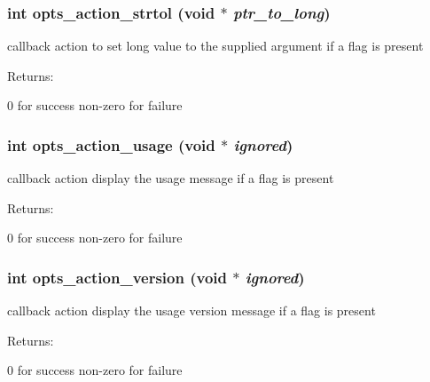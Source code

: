 \subsubsection{\setlength{\rightskip}{0pt plus 5cm}int opts\_\-action\_\-strtol (void $\ast$ {\em ptr\_\-to\_\-long})}\label{group__opts__actions_a3}


callback action to set long value to the supplied argument if a flag is present

\begin{Desc}
\item[Returns: ]\par
0 for success non-zero for failure \end{Desc}
\subsubsection{\setlength{\rightskip}{0pt plus 5cm}int opts\_\-action\_\-usage (void $\ast$ {\em ignored})}\label{group__opts__actions_a4}


callback action display the usage message if a flag is present

\begin{Desc}
\item[Returns: ]\par
0 for success non-zero for failure \end{Desc}
\subsubsection{\setlength{\rightskip}{0pt plus 5cm}int opts\_\-action\_\-version (void $\ast$ {\em ignored})}\label{group__opts__actions_a5}


callback action display the usage version message if a flag is present

\begin{Desc}
\item[Returns: ]\par
0 for success non-zero for failure \end{Desc}
